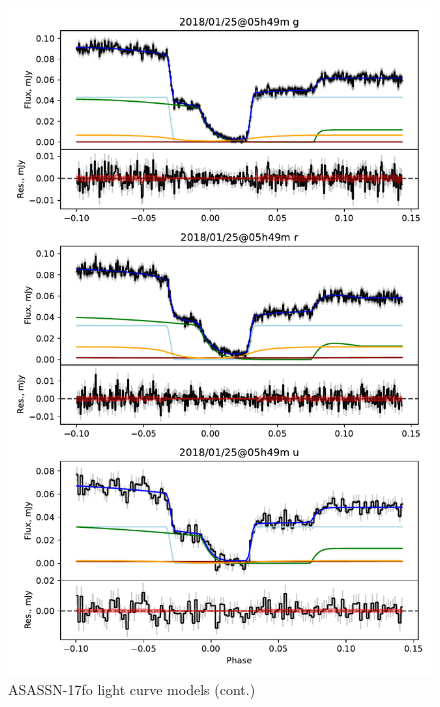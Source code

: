 \begin{figure}
    \centering
    \includegraphics[width=\textwidth]{figures/results/ASASSN-17fo/ASASSN-17fo_2.pdf}
    \caption{ASASSN-17fo light curve models (cont.)}
    \label{fig:ASASSN-17fo all light curves cont 1}
\end{figure}
